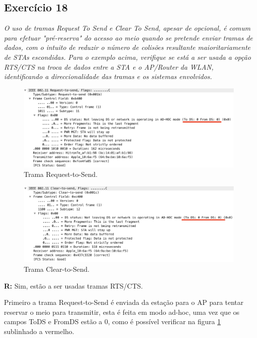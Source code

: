 \documentclass{llncs}
\begin{document}
\subsection{Exercício 18}
\emph{O uso de tramas Request To Send e Clear To Send, apesar de opcional, é comum para efetuar "pré-reserva" do acesso ao meio quando se pretende enviar tramas de dados, com o intuito de reduzir o número de colisões resultante maioritariamente de STAs escondidas. Para o exemplo acima, verifique se está a ser usada a opção RTS/CTS na troca de dados entre a STA e o AP/Router da WLAN, identificando a direccionalidade das tramas e os sistemas envolvidos.}
\begin{figure}[H]
\begin{center}
\includegraphics[scale=0.30]{18_RTS.png} 
\end{center}
\caption{\label{fig:18_RTS}Trama Request-to-Send.}
\end{figure} 

\begin{figure}[H]
\begin{center}
\includegraphics[scale=0.30]{18_CTS.png} 
\end{center}
\caption{\label{fig:18_CTS}Trama Clear-to-Send.}
\end{figure} 

\textbf{R:} Sim, estão a ser usadas tramas RTS/CTS. 

Primeiro a trama Request-to-Send é enviada da estação para o AP para tentar reservar o meio para transmitir, esta é feita em modo ad-hoc, uma vez que os campos ToDS e FromDS estão a 0, como é possível verificar na figura \ref{fig:18_RTS} sublinhado a vermelho.
\end{document}
